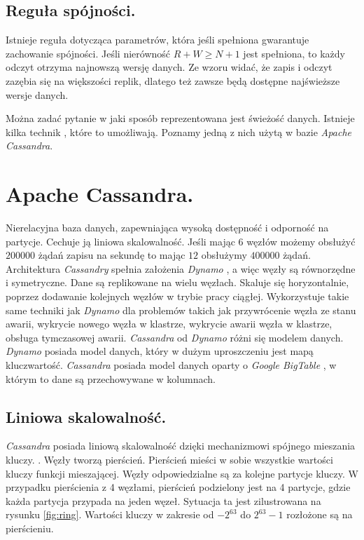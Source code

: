\documentclass[oneside, 11pt, a4paper]{article}
\begin{document}
\begin{multicols}{2}
\vspace{-5mm}
\subsection{Reguła spójności.}
Istnieje reguła dotycząca parametrów, która jeśli spełniona gwarantuje zachowanie spójności. Jeśli nierówność $R + W \geq N + 1$ jest spełniona, to każdy odczyt otrzyma najnowszą wersję danych. Ze wzoru widać, że zapis i odczyt zazębia się na większości replik, dlatego też zawsze będą dostępne najświeższe wersje danych. 

Można zadać pytanie w jaki sposób reprezentowana jest świeżość danych. Istnieje kilka technik \cite{Lamport:1978jq} \cite{fidge1988timestamps}, które to umożliwają. Poznamy jedną z nich użytą w bazie \emph{Apache Cassandra}.

\section{Apache Cassandra.}
Nierelacyjna baza danych, zapewniająca wysoką dostępność i odporność na partycje. Cechuje ją liniowa skalowalność. Jeśli mając $6$ węzłów możemy obsłużyć $200 000$ żądań zapisu na sekundę to mając $12$ obsłużymy $400 000$ żądań. Architektura \emph{Cassandry} spełnia założenia \emph{Dynamo} \cite{DeCandia:2007:DAH:1323293.1294281}, a więc węzły są równorzędne i symetryczne. Dane są replikowane na wielu węzłach. Skaluje się horyzontalnie, poprzez dodawanie kolejnych węzłów w trybie pracy ciągłej. Wykorzystuje takie same techniki jak \emph{Dynamo} dla problemów takich jak przywrócenie węzła ze stanu awarii, wykrycie nowego węzła w klastrze, wykrycie awarii węzła w klastrze, obsługa tymczasowej awarii. \emph{Cassandra} od \emph{Dynamo} różni się modelem danych. \emph{Dynamo} posiada model danych, który w dużym uproszczeniu jest mapą klucz\dywiz wartość. \emph{Cassandra} posiada model danych oparty o \emph{Google BigTable} \cite{Chang:2006:BDS:1267308.1267323}, w którym to dane są przechowywane w kolumnach.

\subsection{Liniowa skalowalność.}
\emph{Cassandra} posiada liniową skalowalność dzięki mechanizmowi spójnego mieszania kluczy. \cite{Karger:1999kd}. Węzły tworzą pierścień. Pierścień mieści w sobie wszystkie wartości kluczy funkcji mieszającej. Węzły odpowiedzialne są za kolejne partycje kluczy. W przypadku pierścienia z 4 węzłami, pierścień podzielony jest na 4 partycje, gdzie każda partycja przypada na jeden węzeł. Sytuacja ta jest zilustrowana na rysunku \ref{fig:ring}. Wartości kluczy w zakresie od $-2^{63} $ do $2^{63} - 1$ rozłożone są na pierścieniu.


\end{multicols}
\end{document}
